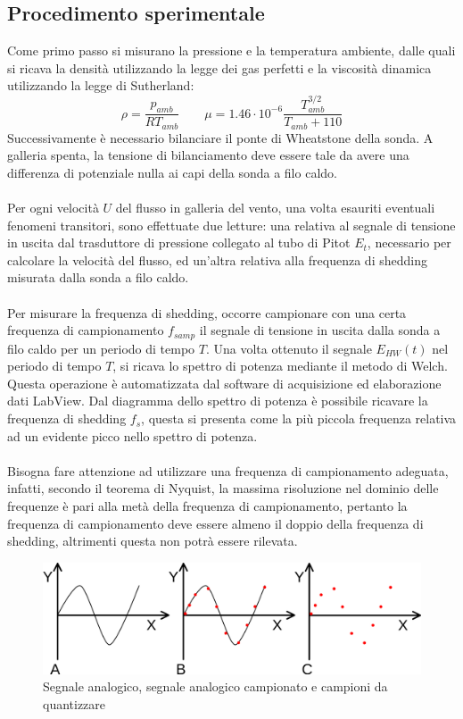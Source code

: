 \subsection{Procedimento sperimentale}
Come primo passo si misurano la pressione e la temperatura ambiente, dalle quali si ricava la densità utilizzando la legge dei gas perfetti e la viscosità dinamica utilizzando la legge di Sutherland:
\begin{equation*}
    \rho = \frac{p_{amb}}{RT_{amb}} \qquad \mu = 1.46\cdot10^{-6} \frac{T_{amb}^{3/2}}{T_{amb}+110} 
\end{equation*}
Successivamente è necessario bilanciare il ponte di Wheatstone della sonda. A galleria spenta, la tensione di bilanciamento deve essere tale da avere una differenza di potenziale nulla ai capi della sonda a filo caldo.\\\\
Per ogni velocità $U$ del flusso in galleria del vento, una volta esauriti eventuali fenomeni transitori, sono effettuate due letture: una relativa al segnale di tensione in uscita dal trasduttore di pressione collegato al tubo di Pitot $E_t$, necessario per calcolare la velocità del flusso, ed un'altra relativa alla frequenza di shedding misurata dalla sonda a filo caldo.\\\\
Per misurare la frequenza di shedding, occorre campionare con una certa frequenza di campionamento $f_{samp}$ il segnale di tensione in uscita dalla sonda a filo caldo per un periodo di tempo $T$. Una volta ottenuto il segnale $E_{HW}(t)$ nel periodo di tempo $T$, si ricava lo spettro di potenza mediante il metodo di Welch. Questa operazione è automatizzata dal software di acquisizione ed elaborazione dati LabView. Dal diagramma dello spettro di potenza è possibile ricavare la frequenza di shedding $f_s$, questa si presenta come la più piccola frequenza relativa ad un evidente picco nello spettro di potenza.\\\\
Bisogna fare attenzione ad utilizzare una frequenza di campionamento adeguata, infatti, secondo il teorema di Nyquist, la massima risoluzione nel dominio delle frequenze è pari alla metà della frequenza di campionamento, pertanto la frequenza di campionamento deve essere almeno il doppio della frequenza di shedding, altrimenti questa non potrà essere rilevata.
\begin{figure}[H]
    \centering
    \includegraphics[width=.7\textwidth]{images/10/nyquist.png}
    \caption{Segnale analogico, segnale analogico campionato e campioni da quantizzare}
\end{figure}

